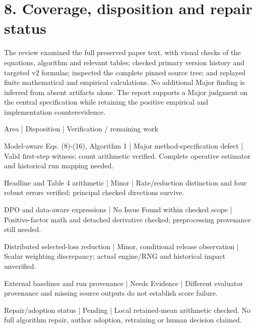 \documentclass[10pt]{article}
\begin{document}
\section*{8. Coverage, disposition and repair status}
The review examined the full preserved paper text, with visual checks of the equations, algorithm and relevant tables; checked primary version history and targeted v2 formulas; inspected the complete pinned source tree; and replayed finite mathematical and empirical calculations. No additional Major finding is inferred from absent artifacts alone. The report supports a Major judgment on the central specification while retaining the positive empirical and implementation counterevidence.\par
Area | Disposition | Verification / remaining work\par
Model-aware Eqs. (8)-(16), Algorithm 1 | Major method-specification defect | Valid first-step witness; count arithmetic verified. Complete operative estimator and historical run mapping needed.\par
Headline and Table 4 arithmetic | Minor | Rate/reduction distinction and four robust errors verified; principal checked directions survive.\par
DPO and data-aware expressions | No Issue Found within checked scope | Positive-factor math and detached derivative checked; preprocessing provenance still needed.\par
Distributed selected-loss reduction | Minor, conditional release observation | Scalar weighting discrepancy; actual engine/RNG and historical impact unverified.\par
External baselines and run provenance | Needs Evidence | Different evaluator provenance and missing source outputs do not establish score failure.\par
Repair/adoption status | Pending | Local retained-mean arithmetic checked. No full algorithm repair, author adoption, retraining or human decision claimed.\par
\end{document}
